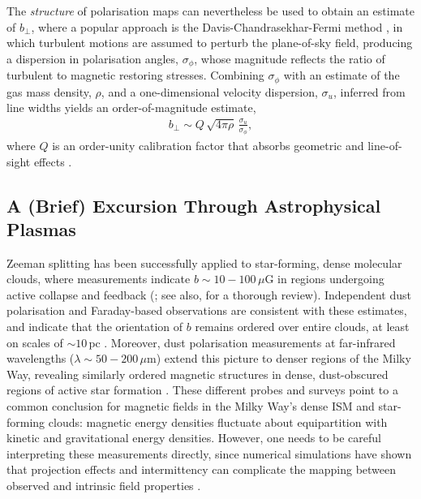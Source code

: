 The \textit{structure} of polarisation maps can nevertheless be used to obtain an estimate of $b_\perp$, where a popular approach is the Davis-Chandrasekhar-Fermi method \citep{davis1951polarization, chandrasekhar1953magnetic}, in which turbulent motions are assumed to perturb the plane-of-sky field, producing a dispersion in polarisation angles, $\sigma_\phi$, whose magnitude reflects the ratio of turbulent to magnetic restoring stresses. Combining $\sigma_\phi$ with an estimate of the gas mass density, $\rho$, and a one-dimensional velocity dispersion, $\sigma_u$, inferred from line widths yields an order-of-magnitude estimate,
\begin{align}
    b_\perp
        \sim Q \, \sqrt{4\pi\rho} \, \frac{\sigma_u}{\sigma_\phi}
    ,
\end{align}
where $Q$ is an order-unity calibration factor that absorbs geometric and line-of-sight effects \citep[\eg][]{ostriker2001density}.

\subsection{A (Brief) Excursion Through Astrophysical Plasmas}
\label{sec:what-we-see}

Zeeman splitting has been successfully applied to star-forming, dense molecular clouds, where measurements indicate $b \sim 10-100 \,\mu\mathrm{G}$ in regions undergoing active collapse and feedback (\eg \citealt{sarma2013very}; see also, \eg \citealt{pattle2022magnetic} for a thorough review). Independent dust polarisation and Faraday-based observations are consistent with these estimates, and indicate that the orientation of $b$ remains ordered over entire clouds, at least on scales of $\sim 10 \,\mathrm{pc}$ \citep{collaboration2015planck, fissel2016balloon, tahani2018helical}. Moreover, dust polarisation measurements at far-infrared wavelengths ($\lambda \sim 50-200 \,\mu\mathrm{m}$) extend this picture to denser regions of the Milky Way, revealing similarly ordered magnetic structures in dense, dust-obscured regions of active star formation \citep{lopez2020sofia}. These different probes and surveys point to a common conclusion for magnetic fields in the Milky Way's dense ISM and star-forming clouds: magnetic energy densities fluctuate about equipartition with kinetic and gravitational energy densities. However, one needs to be careful interpreting these measurements directly, since numerical simulations have shown that projection effects and intermittency can complicate the mapping between observed and intrinsic field properties \citep{camacho2023kinetic, hu2023sub, seta2025magnetic}.

